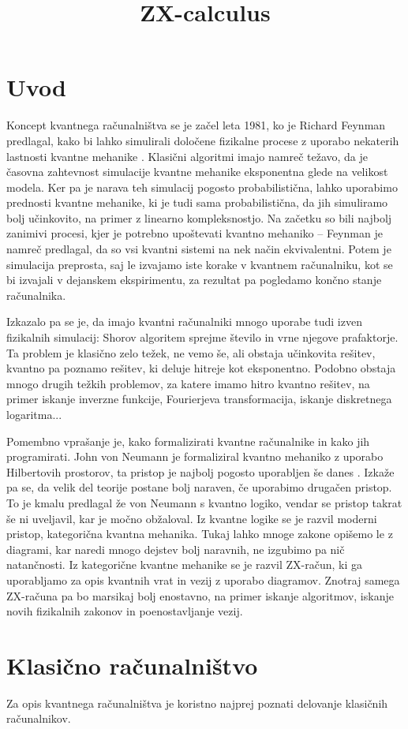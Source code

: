 \documentclass[mat1]{fmfdelo}
\title{ZX-calculus}
\begin{document}
\section{Uvod}
Koncept kvantnega računalništva se je začel leta 1981, ko je Richard Feynman predlagal, kako bi lahko simulirali določene fizikalne procese z uporabo nekaterih lastnosti kvantne mehanike \cite{feynmann}. Klasični algoritmi imajo namreč težavo, da je časovna zahtevnost simulacije kvantne mehanike eksponentna glede na velikost modela. Ker pa je narava teh simulacij pogosto probabilistična, lahko uporabimo prednosti kvantne mehanike, ki je tudi sama probabilistična, da jih simuliramo bolj učinkovito, na primer z linearno kompleksnostjo. Na začetku so bili najbolj zanimivi procesi, kjer je potrebno upoštevati kvantno mehaniko -- Feynman je namreč predlagal, da so vsi kvantni sistemi na nek način ekvivalentni. Potem je simulacija preprosta, saj le izvajamo iste korake v kvantnem računalniku, kot se bi izvajali v dejanskem ekspirimentu, za rezultat pa pogledamo končno stanje računalnika.

Izkazalo pa se je, da imajo kvantni računalniki mnogo uporabe tudi izven fizikalnih simulacij: Shorov algoritem sprejme število in vrne njegove prafaktorje. Ta problem je klasično zelo težek, ne vemo še, ali obstaja učinkovita rešitev, kvantno pa poznamo rešitev, ki deluje hitreje kot eksponentno. Podobno obstaja mnogo drugih težkih problemov, za katere imamo hitro kvantno rešitev, na primer iskanje inverzne funkcije, Fourierjeva transformacija, iskanje diskretnega logaritma...

Pomembno vprašanje je, kako formalizirati kvantne računalnike in kako jih programirati. John von Neumann je formaliziral kvantno mehaniko z uporabo Hilbertovih prostorov, ta pristop je najbolj pogosto uporabljen še danes \cite{neumann}. Izkaže pa se, da velik del teorije postane bolj naraven, če uporabimo drugačen pristop. To je kmalu predlagal že von Neumann s kvantno logiko, vendar se pristop takrat še ni uveljavil, kar je močno obžaloval. Iz kvantne logike se je razvil moderni pristop, kategorična kvantna mehanika. Tukaj lahko mnoge zakone opišemo le z diagrami, kar naredi mnogo dejstev bolj naravnih, ne izgubimo pa nič natančnosti. Iz kategorične kvantne mehanike se je razvil ZX-račun, ki ga uporabljamo za opis kvantnih vrat in vezij z uporabo diagramov. Znotraj samega ZX-računa pa bo marsikaj bolj enostavno, na primer iskanje algoritmov, iskanje novih fizikalnih zakonov in poenostavljanje vezij.

\section{Klasično računalništvo}
Za opis kvantnega računalništva je koristno najprej poznati delovanje klasičnih računalnikov. 
\end{document}
